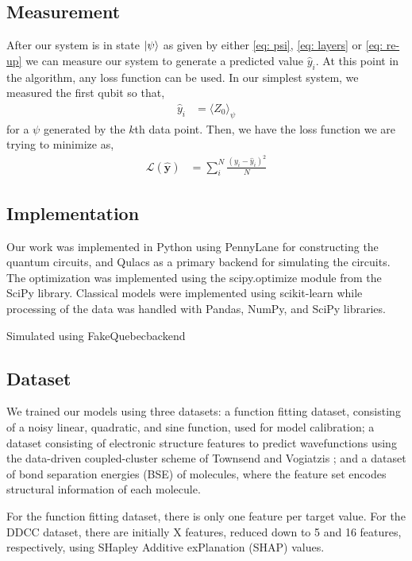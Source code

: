 \documentclass[journal=jacsat,manuscript=article]{achemso}
\begin{document}
\subsection{Measurement}
After our system is in state $\ket\psi$ as given by either \eqref{eq: psi}, \eqref{eq: layers} or \eqref{eq: re-up} we can measure our system to generate a predicted value $\hat y_i$. At this point in the algorithm, any loss function can be used. In our simplest system, we measured the first qubit so that,
\begin{align}
    \hat y_i &= \langle Z_0 \rangle _\psi 
\end{align}
for a $\psi$ generated by the $k$th data point. Then, we have the loss function we are trying to minimize as,
\begin{align}
    \mathcal{L}(\bm{\hat y}) &= \sum_i^N \frac{(y_i - \hat y_i)^2}{N}
\end{align}

\subsection{Implementation}
Our work was implemented in Python using PennyLane for constructing the quantum circuits, and Qulacs as a primary backend for simulating the circuits. The optimization was implemented using the scipy.optimize module from the SciPy library. Classical models were implemented using scikit-learn while processing of the data was handled with Pandas, NumPy, and SciPy libraries.  


Simulated using FakeQuebecbackend

\subsection{Dataset}
We trained our models using three datasets: a function fitting dataset, consisting of a noisy linear, quadratic, and sine function, used for model calibration; a dataset consisting of electronic structure features to predict wavefunctions using the data-driven coupled-cluster scheme of Townsend and Vogiatzis \cite{townsend_data-driven_2019}; and a dataset of bond separation energies (BSE) of molecules, where the feature set encodes structural information of each molecule. 

For the function fitting dataset, there is only one feature per target value.
For the DDCC dataset, there are initially X features, reduced down to 5 and 16 features, respectively, using SHapley Additive exPlanation (SHAP) values.\cite{lundberg_unified_2017} 
\end{document}
